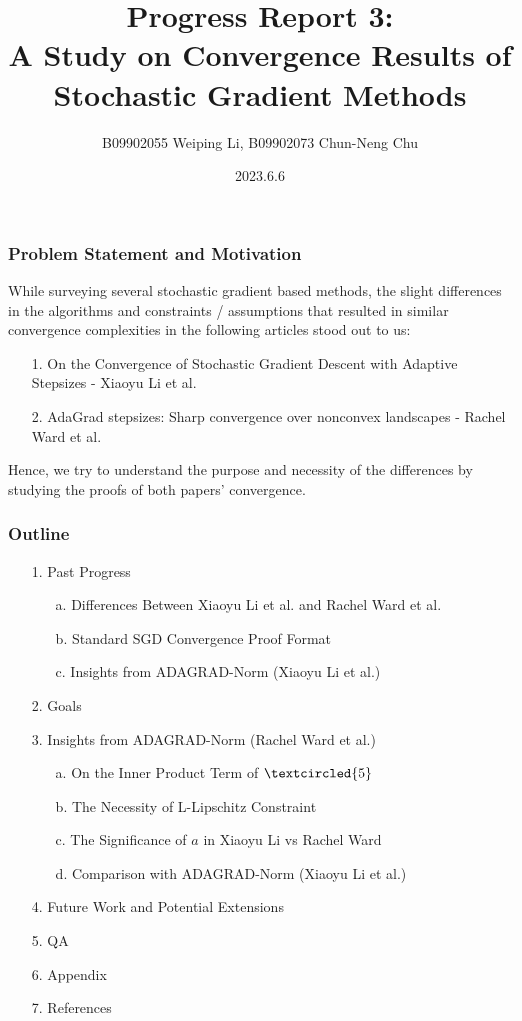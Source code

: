 \documentclass{beamer}
\title{Progress Report 3:\\A Study on Convergence Results of Stochastic Gradient Methods}
\author{B09902055 Weiping Li, B09902073 Chun-Neng Chu}
\date{2023.6.6}
\begin{document}
\frame{\titlepage}

\begin{frame}
\frametitle{Problem Statement and Motivation}
While surveying several stochastic gradient based methods, the slight differences in the algorithms and constraints / assumptions that resulted in similar convergence complexities in the following articles stood out to us:
\begin{enumerate}
    \item [1.] On the Convergence of Stochastic Gradient Descent with Adaptive Stepsizes - Xiaoyu Li et al.
    \item [2.] AdaGrad stepsizes: Sharp convergence over nonconvex landscapes - Rachel Ward et al.

\end{enumerate}
Hence, we try to understand the purpose and necessity of the differences by studying the proofs of both papers' convergence.
\end{frame}

\begin{frame}
\frametitle{Outline}
\begin{enumerate}
        \item [1.] Past Progress
            \begin{enumerate}
                 \item [a.] Differences Between Xiaoyu Li et al. and Rachel Ward et al.
                 \item [b.] Standard SGD Convergence Proof Format
                 \item [c.] Insights from ADAGRAD-Norm (Xiaoyu Li et al.)
            \end{enumerate}
        \item [2.] Goals
        \item [3.] Insights from ADAGRAD-Norm (Rachel Ward et al.)
            \begin{enumerate}
                 \item [a.] On the Inner Product Term of $\textcircled{5}$
                 \item [b.] The Necessity of L-Lipschitz Constraint
                 \item [c.] The Significance of $a$ in Xiaoyu Li vs Rachel Ward
                 \item [d.] Comparison with ADAGRAD-Norm (Xiaoyu Li et al.)
            \end{enumerate}
        \item [4.] Future Work and Potential Extensions
        \item [5.] QA
        \item [6.] Appendix
        \item [7.] References
    \end{enumerate}
\end{frame}
\end{document}
